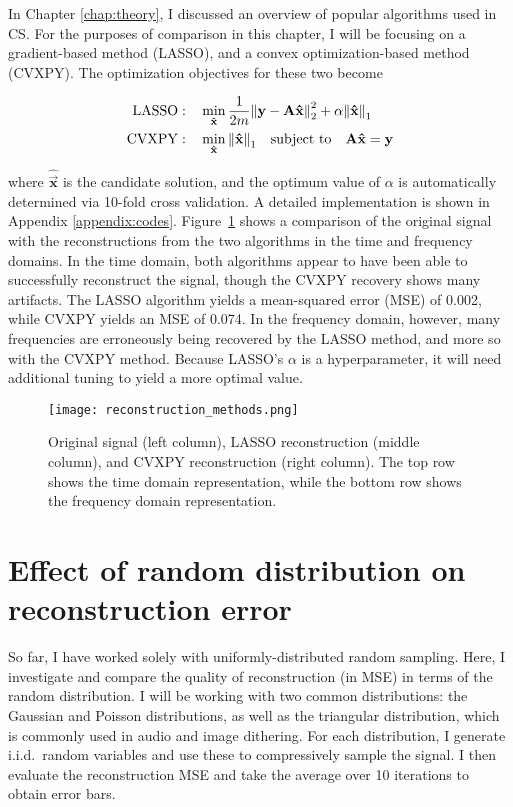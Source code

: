 In Chapter \ref{chap:theory}, I discussed an overview of popular algorithms used in CS. For the purposes of comparison in this chapter, I will be focusing on a gradient-based method (LASSO), and a convex optimization-based method (CVXPY). The optimization objectives for these two become

\begin{align}
	\mathrm{LASSO}:& \quad \min_{\bm\hat{\text{\bfseries x}}} \frac{1}{2m} \norm{\text{\bfseries y} - \text{\bfseries A}\bm\hat{\text{\bfseries x}}}_2^2 + \alpha \norm{\bm\hat{\text{\bfseries x}}}_1 \label{eq:random-lasso-objective} \\
	\mathrm{CVXPY}:& \quad \min_{\bm\hat{\text{\bfseries x}}} \norm{\bm\hat{\text{\bfseries x}}}_1 \quad \textrm{subject to} \quad \text{\bfseries A}\bm\hat{\text{\bfseries x}} = \text{\bfseries y} \label{eq:random-cvxpy-objective}
\end{align}

\noindent where $\bm\hat{\vec{x}}$ is the candidate solution, and the optimum value of $\alpha$ is automatically determined via 10-fold cross validation. A detailed implementation is shown in Appendix \ref{appendix:codes}. Figure~\ref{fig:random-compare-algorithms} shows a comparison of the original signal with the reconstructions from the two algorithms in the time and frequency domains. In the time domain, both algorithms appear to have been able to successfully reconstruct the signal, though the CVXPY recovery shows many artifacts. The LASSO algorithm yields a mean-squared error (MSE) of 0.002, while CVXPY yields an MSE of 0.074. In the frequency domain, however, many frequencies are erroneously being recovered by the LASSO method, and more so with the CVXPY method. Because LASSO's $\alpha$ is a hyperparameter, it will need additional tuning to yield a more optimal value.

\begin{figure}[htb]
	\texttt{[image: reconstruction\_methods.png]}
	\caption{Original signal (left column), LASSO reconstruction (middle column), and CVXPY reconstruction (right column). The top row shows the time domain representation, while the bottom row shows the frequency domain representation.}
	\label{fig:random-compare-algorithms}
\end{figure}


\section{Effect of random distribution on reconstruction error}
\label{sec:random-distro}
So far, I have worked solely with uniformly-distributed random sampling. Here, I investigate and compare the quality of reconstruction (in MSE) in terms of the random distribution. I will be working with two common distributions: the Gaussian and Poisson distributions, as well as the triangular distribution, which is commonly used in audio and image dithering. For each distribution, I generate i.i.d.~random variables and use these to compressively sample the signal. I then evaluate the reconstruction MSE and take the average over 10 iterations to obtain error bars.

